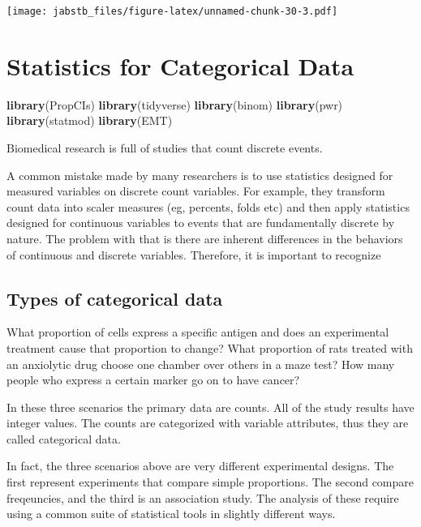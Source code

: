 \documentclass[]{book}
\newenvironment{Shaded}{\begin{snugshade}}{\end{snugshade}}
\newcommand{\KeywordTok}[1]{\textcolor[rgb]{0.13,0.29,0.53}{\textbf{#1}}}
\newcommand{\NormalTok}[1]{#1}
\begin{document}
\texttt{[image: jabstb\_files/figure-latex/unnamed-chunk-30-3.pdf]}

\hypertarget{statistics-for-categorical-data}{%
\chapter{Statistics for Categorical Data}\label{statistics-for-categorical-data}}

\begin{Shaded}
\begin{Highlighting}[]
\KeywordTok{library}\NormalTok{(PropCIs)}
\KeywordTok{library}\NormalTok{(tidyverse)}
\KeywordTok{library}\NormalTok{(binom)}
\KeywordTok{library}\NormalTok{(pwr)}
\KeywordTok{library}\NormalTok{(statmod)}
\KeywordTok{library}\NormalTok{(EMT)}
\end{Highlighting}
\end{Shaded}

Biomedical research is full of studies that count discrete events.

A common mistake made by many researchers is to use statistics designed for measured variables on discrete count variables. For example, they transform count data into scaler measures (eg, percents, folds etc) and then apply statistics designed for continuous variables to events that are fundamentally discrete by nature. The problem with that is there are inherent differences in the behaviors of continuous and discrete variables. Therefore, it is important to recognize

\hypertarget{types-of-categorical-data}{%
\section{Types of categorical data}\label{types-of-categorical-data}}

What proportion of cells express a specific antigen and does an experimental treatment cause that proportion to change? What proportion of rats treated with an anxiolytic drug choose one chamber over others in a maze test? How many people who express a certain marker go on to have cancer?

In these three scenarios the primary data are counts. All of the study results have integer values. The counts are categorized with variable attributes, thus they are called categorical data.

In fact, the three scenarios above are very different experimental designs. The first represent experiments that compare simple proportions. The second compare freqeuncies, and the third is an association study. The analysis of these require using a common suite of statistical tools in slightly different ways.
\end{document}
